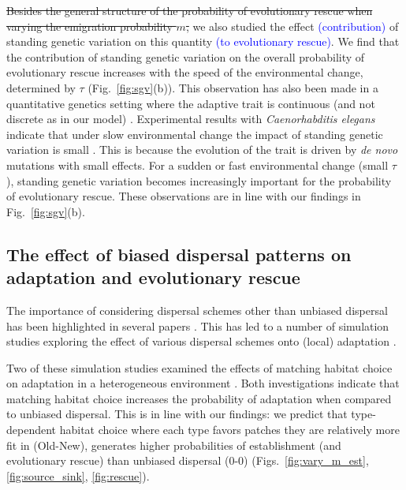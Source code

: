 \documentclass[a4paper,11pt]{article}
\newcommand{\francois}[1]{\textcolor{blue}{(#1)}}
\newcommand{\chg}[1]{\textcolor{change}{#1}}
\begin{document}
\st{Besides the general structure of the probability of evolutionary rescue when varying the emigration probability $m$, }we also studied the effect \francois{contribution} of standing genetic variation on this quantity \francois{to evolutionary rescue}. 
We find that the contribution of standing genetic variation on the overall probability of evolutionary rescue increases with the speed of the environmental change, determined by $\tau$ (Fig.~\ref{fig:sgv}(b)). 
This observation has also been made in a quantitative genetics setting where the adaptive trait is continuous (and not discrete as in our model) \citep{matuszewski_2015}. Experimental results with \textit{Caenorhabditis elegans} indicate that under slow environmental change the impact of standing genetic variation is small \citep{guzella_2018}. This is because the evolution of the trait is driven by \textit{de novo} mutations with small effects. For a sudden or fast environmental change (small $\tau$), standing genetic variation becomes increasingly important for the probability of evolutionary rescue. These observations are in line with our findings in Fig.~\ref{fig:sgv}(b). %

\subsection*{The effect of \chg{biased} dispersal patterns on adaptation and evolutionary rescue}
The importance of considering dispersal schemes \chg{other than} \chg{unbiased} dispersal has been highlighted in several papers \citep{edelaar_2008,clobert_2009,edelaar_2012}. This has led to a number of simulation studies exploring the effect of various dispersal schemes onto \chg{(local)} adaptation %
\citep[e.g.][]{vuilleumier_2010,holt_2015,mortier_2018,pellerin_2018}. 

Two of these simulation studies examined the effects of matching habitat choice on adaptation \chg{in} a heterogeneous environment \citep{vuilleumier_2010,holt_2015}. Both investigations indicate that matching habitat choice increases the probability of adaptation when compared to \chg{unbiased} dispersal. 
This is in line with our findings: we predict that type-dependent habitat choice \chg{where each type favors patches they are relatively more fit in (Old-New),} generates higher probabilities of establishment \chg{(}and evolutionary rescue\chg{)} than \chg{unbiased} dispersal \chg{(0-0)} (Figs.~\ref{fig:vary_m_est}, \ref{fig:source_sink}, \ref{fig:rescue}). 
\end{document}
